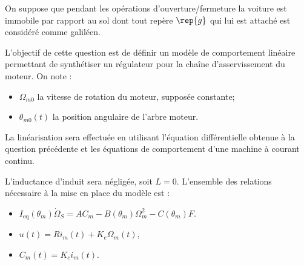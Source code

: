 On suppose que pendant les opérations d’ouverture/fermeture la voiture est
immobile par rapport au sol dont tout repère $\rep{g}$ qui lui est attaché est considéré
comme galiléen.

%


L’objectif de cette question est de définir un modèle de comportement
linéaire permettant de synthétiser un régulateur pour la chaîne d’asservissement
du moteur. On note :
\begin{itemize}
\item $\Omega_{m0}$ la vitesse de rotation du moteur, supposée constante;
\item $\theta_{m0}(t)$ la position angulaire de l’arbre moteur.
\end{itemize}
La linéarisation sera effectuée en utilisant l’équation différentielle obtenue à la
question précédente et les équations de comportement d’une
machine à courant continu.

L’inductance d’induit sera négligée, soit $L=0$.
L’ensemble des relations nécessaire à la mise en place du modèle est :
\begin{itemize}
 \item $I_{\text{eq}}\left( \theta_m\right)\dot{\Omega}_S = AC_m-B\left( \theta_m\right)\Omega_m^2-C\left( \theta_m\right)F$.
 \item $u(t)=Ri_m(t)+K_e\Omega_m(t)$, 
 \item $C_m(t)=K_ci_m(t)$.
\end{itemize}


